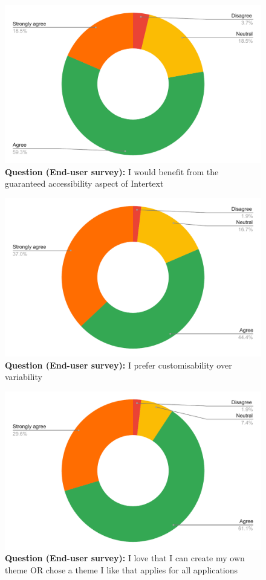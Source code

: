 \begin{figure}[H]
  \centering
  \includegraphics[width=13cm]{thesis/paper/images/p2u_q5.pdf}
  \textbf{Question (End-user survey):} I would benefit from the guaranteed accessibility aspect of Intertext
\end{figure}

\begin{figure}[H]
  \centering
  \includegraphics[width=13cm]{thesis/paper/images/p2u_q6.pdf}
  \textbf{Question (End-user survey):} I prefer customisability over variability
\end{figure}

\begin{figure}[H]
  \centering
  \includegraphics[width=13cm]{thesis/paper/images/p2u_q7.pdf}
  \textbf{Question (End-user survey):} I love that I can create my own theme OR chose a theme I like that applies for all applications
\end{figure}

